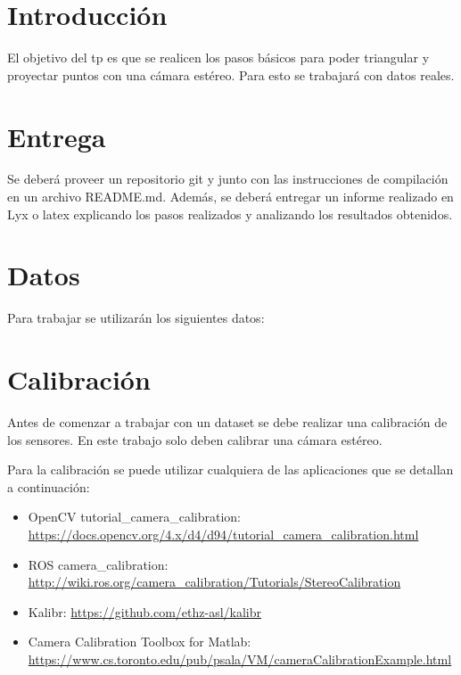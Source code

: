\documentclass[tp]{lcc}
\begin{document}
\maketitle

\section{Introducción}

El objetivo del tp es que se realicen los pasos básicos para poder triangular y proyectar puntos con una cámara estéreo. 
Para esto se trabajará con datos reales.


\section{Entrega}
Se deberá proveer un repositorio git y junto con las instrucciones de compilación en un archivo README.md.
Además, se deberá entregar un informe realizado en Lyx o latex explicando los pasos realizados y analizando los resultados obtenidos.

\section{Datos}
Para trabajar se utilizarán los siguientes datos:

\section{Calibración}
Antes de comenzar a trabajar con un dataset se debe realizar una calibración de los sensores. En este trabajo solo deben calibrar una cámara estéreo.

Para la calibración se puede utilizar cualquiera de las aplicaciones que se detallan a continuación:
\begin{itemize}
	\item OpenCV tutorial\_camera\_calibration: \href{https://docs.opencv.org/4.x/d4/d94/tutorial_camera_calibration.html}{https://docs.opencv.org/4.x/d4/d94/tutorial\_camera\_calibration.html}
	\item ROS camera\_calibration: \href{http://wiki.ros.org/camera_calibration/Tutorials/StereoCalibration}{http://wiki.ros.org/camera\_calibration/Tutorials/StereoCalibration}
	\item Kalibr: \href{https://github.com/ethz-asl/kalibr}{https://github.com/ethz-asl/kalibr}
	\item Camera Calibration Toolbox for Matlab: \href{https://www.cs.toronto.edu/pub/psala/VM/cameraCalibrationExample.html}{https://www.cs.toronto.edu/pub/psala/VM/cameraCalibrationExample.html}
\end{itemize}
\end{document}
